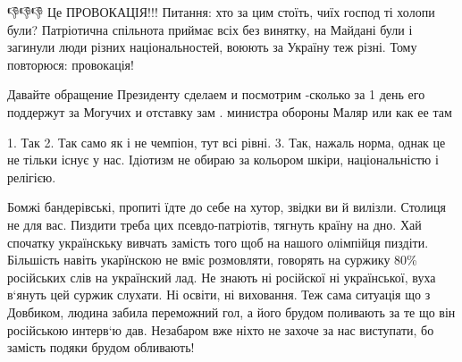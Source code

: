 \begin{itemize}
 

👎👎👎 Це ПРОВОКАЦІЯ!!! Питання: хто за цим стоїть, чиїх господ ті холопи були?
Патріотична спільнота приймає всіх без винятку, на Майдані були і загинули люди
різних національностей, воюють за Україну теж різні. Тому повторюся:
провокація!

 

Давайте обращение Президенту сделаем и посмотрим -сколько за 1 день его
поддержут за Могучих и отставку зам . министра обороны Маляр или как ее там


 

1. Так 2. Так само як і не чемпіон, тут всі рівні. 3. Так, нажаль норма, однак
це не тільки існує у нас. Ідіотизм не обираю за кольором шкіри, національністю
і релігією.

Бомжі бандерівські, пропиті їдте до себе на хутор, звідки ви й вилізли. Столиця
не для вас. Пиздити треба цих псевдо-патріотів, тягнуть країну на дно. Хай
спочатку українскьку вивчать замість того щоб на нашого олімпійця пиздіти.
Більшість навіть укарїнскою не вміє розмовляти, говорять на суржику 80\%
російських слів на українский лад. Не знають ні російскої ні української, вуха
в‘януть цей суржик слухати. Ні освіти, ні виховання. Теж сама ситуація що з
Довбиком, людина забила переможний гол, а його брудом поливають за те що він
російською интерв‘ю дав. Незабаром вже ніхто не захоче за нас виступати, бо
замість подяки брудом обливають!

\begin{itemize}
 

\end{itemize}
\end{itemize}
